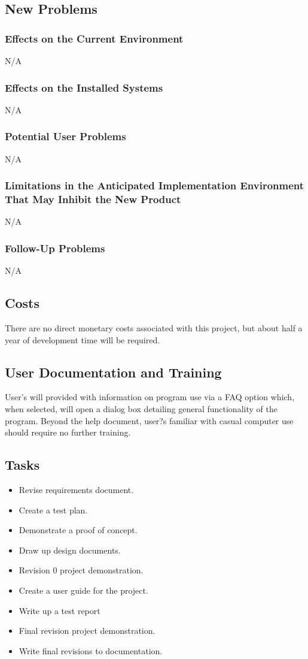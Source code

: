 \documentclass[12pt]{article}
\begin{document}
\subsection{New Problems}
\subsubsection{Effects on the Current Environment}
N/A
\subsubsection{Effects on the Installed Systems}
N/A
\subsubsection{Potential User Problems}
N/A
\subsubsection{Limitations in the Anticipated Implementation Environment That
May Inhibit the New Product}
N/A
\subsubsection{Follow-Up Problems}
N/A
\subsection{Costs}
There are no direct monetary costs associated with this project, but about half a year of development time will be required.\\

\subsection{User Documentation and Training}
User's will provided with information on program use via a FAQ option which, when selected, will open a dialog box detailing general functionality of the program. Beyond the help document, user?s familiar with casual computer use should require no further training.\\

\subsection{Tasks}
\begin{itemize}
	\item Revise requirements document.
	\item Create a test plan.
	\item Demonstrate a proof of concept.
	\item Draw up design documents.
	\item Revision 0 project demonstration.
	\item Create a user guide for the project.
	\item Write up a test report
	\item Final revision project demonstration.
	\item Write final revisions to documentation.
\end{itemize}
\end{document}
